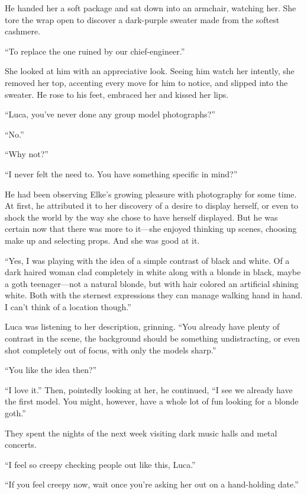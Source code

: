 He handed her a soft package and sat down into an armchair, watching her. She tore the wrap open to discover a dark-purple sweater made from the softest cashmere.

``To replace the one ruined by our chief-engineer.''

She looked at him with an appreciative look. Seeing him watch her intently, she removed her top, accenting every move for him to notice, and slipped into the sweater. He rose to his feet, embraced her and kissed her lips.

``Luca, you've never done any group model photographs?''

``No.''

``Why not?''

``I never felt the need to. You have something specific in mind?''

He had been observing Elke's growing pleasure with photography for some time. At first, he attributed it to her discovery of a desire to display herself, or even to shock the world by the way she chose to have herself displayed. But he was certain now that there was more to it---she enjoyed thinking up scenes, choosing make up and selecting props. And she was good at it.

``Yes, I was playing with the idea of a simple contrast of black and white. Of a dark haired woman clad completely in white along with a blonde in black, maybe a goth teenager---not a natural blonde, but with hair colored an artificial shining white. Both with the sternest expressions they can manage walking hand in hand. I can't think of a location though.''

Luca was listening to her description, grinning. ``You already have plenty of contrast in the scene, the background should be something undistracting, or even shot completely out of focus, with only the models sharp.''

``You like the idea then?''

``I love it.'' Then, pointedly looking at her, he continued, ``I see we already have the first model. You might, however, have a whole lot of fun looking for a blonde goth.''

\sectionline

They spent the nights of the next week visiting dark music halls and metal concerts.

``I feel so creepy checking people out like this, Luca.''

``If you feel creepy now, wait once you're asking her out on a hand-holding date.''

